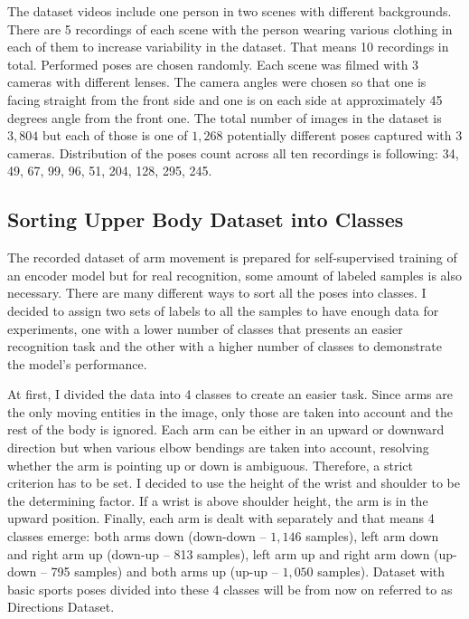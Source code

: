 The dataset videos include one person in two scenes with different backgrounds. There are 5 recordings of each scene with the person wearing various clothing in each of them to increase variability in the dataset. That means 10 recordings in total. Performed poses are chosen randomly. Each scene was filmed with 3 cameras with different lenses. The camera angles were chosen so that one is facing straight from the front side and one is on each side at approximately 45 degrees angle from the front one. The total number of images in the dataset is $3{,}804$ but each of those is one of $1{,}268$ potentially different poses captured with 3 cameras. Distribution of the poses count across all ten recordings is following: 34, 49, 67, 99, 96, 51, 204, 128, 295, 245.

\subsection{\label{sec:dataset-labels}Sorting Upper Body Dataset into Classes}

The recorded dataset of arm movement is prepared for self-supervised training of an encoder model but for real recognition, some amount of labeled samples is also necessary. There are many different ways to sort all the poses into classes. I decided to assign two sets of labels to all the samples to have enough data for experiments, one with a lower number of classes that presents an easier recognition task and the other with a higher number of classes to demonstrate the model's performance.

At first, I divided the data into 4 classes to create an easier task. Since arms are the only moving entities in the image, only those are taken into account and the rest of the body is ignored. Each arm can be either in an upward or downward direction but when various elbow bendings are taken into account, resolving whether the arm is pointing up or down is ambiguous. Therefore, a strict criterion has to be set. I decided to use the height of the wrist and shoulder to be the determining factor. If a wrist is above shoulder height, the arm is in the upward position. Finally, each arm is dealt with separately and that means 4 classes emerge: both arms down (down-down -- $1{,}146$ samples), left arm down and right arm up (down-up -- 813 samples), left arm up and right arm down (up-down -- 795 samples) and both arms up (up-up -- $1{,}050$ samples). Dataset with basic sports poses divided into these 4 classes will be from now on referred to as Directions Dataset.

